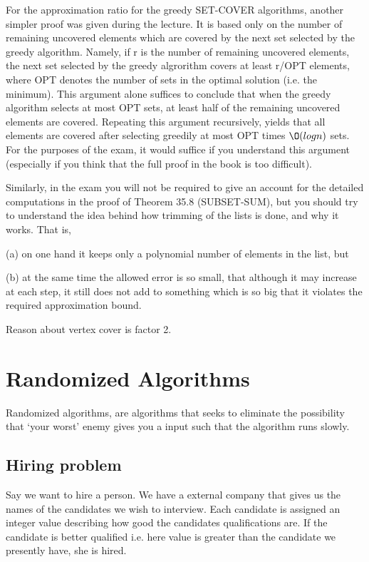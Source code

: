 \documentclass[10pt]{article}
\begin{document}
For the approximation ratio for the greedy SET-COVER algorithms, another simpler proof was given during the lecture. It is based only on the number of remaining uncovered elements which are covered by the next set  selected by the greedy algorithm. Namely, if r is the number of remaining uncovered elements, the next set selected by the greedy algrorithm covers at least r/OPT elements, where OPT denotes the number of sets in the optimal solution (i.e. the minimum). This argument alone suffices to conclude that when the greedy algorithm selects at most OPT sets,  at least half of the remaining uncovered elements are covered. Repeating this argument recursively, yields that all elements are covered after selecting greedily at most OPT times $\O(log n)$ sets. For the purposes of the exam, it would suffice if you understand this argument (especially if you think that the full proof in the book is too difficult).

Similarly, in the exam you will not be required to give an account for the detailed computations in the proof of Theorem 35.8 (SUBSET-SUM), but you should try to understand the idea behind how trimming of the lists is done, and why it works. That is,

(a) on one hand it keeps only a polynomial number of elements in the list, but

(b) at the same time the allowed error is so small, that although it may increase at each step, it still does not add to something which is so big that it violates the required approximation bound.

Reason about vertex cover is factor 2.

\clearpage \newpage
\section{Randomized Algorithms} %
\label{sec:randomized_algoritms}
Randomized algorithms, are algorithms that seeks to eliminate the possibility that `your worst' enemy gives you a input such that the algorithm runs slowly.

\subsection{Hiring problem} %
\label{sub:hiring_problem}
Say we want to hire a person. We have a external company that gives us the names of the candidates we wish to interview. Each candidate is assigned an integer value describing how good the candidates qualifications are. If the candidate is better qualified i.e. here value is greater than the candidate we presently have, she is hired.
\end{document}
